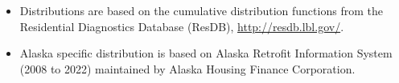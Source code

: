 \begin{itemize}
\item Distributions are based on the cumulative distribution functions from the Residential Diagnostics Database (ResDB), \href{http://resdb.lbl.gov/}{http://resdb.lbl.gov/}.
\item Alaska specific distribution is based on Alaska Retrofit Information System (2008 to 2022) maintained by Alaska Housing Finance Corporation.
\end{itemize}
